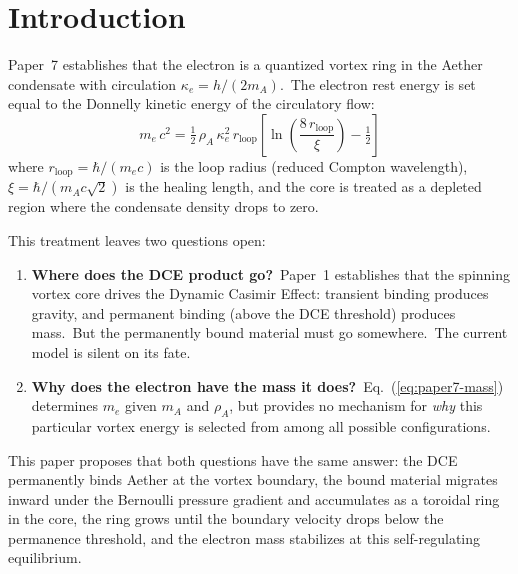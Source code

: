 \documentclass[12pt,letterpaper]{article}
\newcommand{\rhoa}{\rho_{\!A}}
\newcommand{\rloop}{r_{\mathrm{loop}}}
\begin{document}
\section{Introduction}
\label{sec:introduction}

Paper~7 \cite{otto-quantum} establishes that the electron is a quantized
vortex ring in the Aether condensate with circulation
$\kappa_e = h/(2m_A)$.\ The electron rest energy is set equal to the Donnelly
kinetic energy of the circulatory flow:
%
\begin{equation}
  m_e\,c^2 = \tfrac{1}{2}\,\rhoa\,\kappa_e^2\,\rloop
  \left[\ln\!\left(\frac{8\,\rloop}{\xi}\right) - \tfrac{1}{2}\right]
  \label{eq:paper7-mass}
\end{equation}
%
where $\rloop = \hbar/(m_e c)$ is the loop radius (reduced Compton
wavelength), $\xi = \hbar/(m_A c\sqrt{2})$ is the healing length, and the
core is treated as a depleted region where the condensate density drops to
zero.

This treatment leaves two questions open:

\begin{enumerate}[leftmargin=2em]
  \item \textbf{Where does the DCE product go?}\ Paper~1
    \cite{otto-overview} establishes that the spinning vortex core drives the
    Dynamic Casimir Effect: transient binding produces gravity, and permanent
    binding (above the DCE threshold) produces mass.\ But the permanently
    bound material must go somewhere.\ The current model is silent on its
    fate.

  \item \textbf{Why does the electron have the mass it does?}\
    Eq.~(\ref{eq:paper7-mass}) determines $m_e$ given $m_A$ and $\rhoa$, but
    provides no mechanism for \emph{why} this particular vortex energy is
    selected from among all possible configurations.
\end{enumerate}

This paper proposes that both questions have the same answer: the DCE
permanently binds Aether at the vortex boundary, the bound material migrates
inward under the Bernoulli pressure gradient and accumulates as a toroidal
ring in the core, the ring grows until the boundary velocity drops below the
permanence threshold, and the electron mass stabilizes at this
self-regulating equilibrium.


\end{document}
